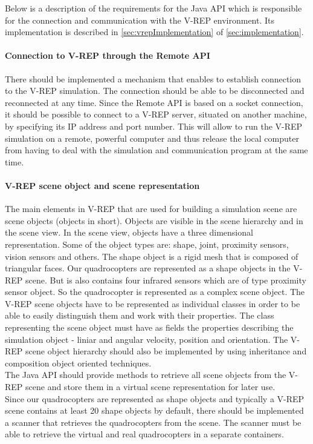     Below is a description of the requirements for the Java API which is responsible for the connection and communication with the V-REP environment. Its implementation is described in \ref{sec:vrepImplementation} of \ref{sec:implementation}.
    
    \paragraph{Connection to V-REP through the Remote API}
    
    There should be implemented a mechanism that enables to establish connection to the V-REP simulation. The connection should be able to be disconnected and reconnected at any time. Since the Remote API is based on a socket connection, it should be possible to connect to a V-REP server, situated on another machine, by specifying its IP address and port number. This will allow to run the V-REP simulation on a remote, powerful computer and thus release the local computer from having to deal with the simulation and communication program at the same time.
    
    \paragraph{V-REP scene object and scene representation}\label{sceneobject}
    The main elements in V-REP that are used for building a simulation scene are scene objects (objects in short). Objects are visible in the scene hierarchy and in the scene view. In the scene view, objects have a three dimensional representation. Some of the object types are: shape, joint, proximity sensors, vision sensors and others. The shape object is a rigid mesh that is composed of triangular faces. Our quadrocopters are represented as a shape objects in the V-REP scene. But is also contains four infrared sensors which are of type proximity sensor object. So the quadrocopter is represented as a complex scene object. 
    The V-REP scene objects have to be represented as individual classes in order to be able to easily distinguish them and work with their properties. The class representing the scene object must have as fields the properties describing the simulation object - liniar and angular velocity, position and orientation. The V-REP scene object hierarchy should also be implemented by using inheritance and composition object oriented techniques. \\
    The Java API should provide methods to retrieve all scene objects from the V-REP scene and store them in a virtual scene representation for later use.\\
    Since our quadrocopters are represented as shape objects and typically a V-REP scene contains at least 20 shape objects by default, there should be implemented a scanner that retrieves the quadrocopters from the scene. The scanner must be able to retrieve the virtual and real quadrocopters in a separate containers.
    
